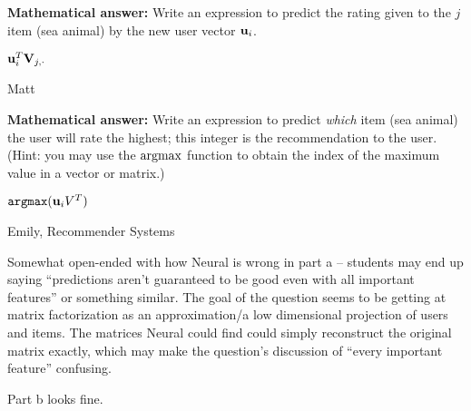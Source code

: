 \begin{parts}
\begin{subparts}
    \subpart[1] \textbf{Mathematical answer:} 
    Write an expression to predict the rating given to the $j$ item (sea animal) by the new user vector $\mathbf{u}_i$.
    \begin{tcolorbox}[fit,height=2cm, width=7cm, blank, borderline={1pt}{-2pt}]
    \end{tcolorbox}
    \begin{soln}
    $\mathbf{u}_i^T \mathbf{V}_{j,\cdot}$
    \end{soln}
    \begin{qauthor}
    Matt
    \end{qauthor}
    
    \subpart[2] \textbf{Mathematical answer:} 
    Write an expression to predict \textit{which} item (sea animal) the user will rate the highest; this integer is the recommendation to the user.
    (Hint: you may use the $\argmax$ function to obtain the index of the maximum value in a vector or matrix.)
    \begin{tcolorbox}[fit,height=2cm, width=7cm, blank, borderline={1pt}{-2pt}]
    \end{tcolorbox}
    \begin{soln}
    $\texttt{argmax}(\mathbf{u}_i V^T)$
    \end{soln}
    \begin{qauthor}
    Emily, Recommender Systems
    \end{qauthor}
    \begin{qtester}
    Somewhat open-ended with how Neural is wrong in part a -- students may end up saying ``predictions aren't guaranteed to be good even with all important features'' or something similar. The goal of the question seems to be getting at matrix factorization as an approximation/a low dimensional projection of users and items. The matrices Neural could find could simply reconstruct the original matrix exactly, which may make the question's discussion of ``every important feature'' confusing.

    Part b looks fine.
    \end{qtester}
    
\end{subparts}

\end{parts}


